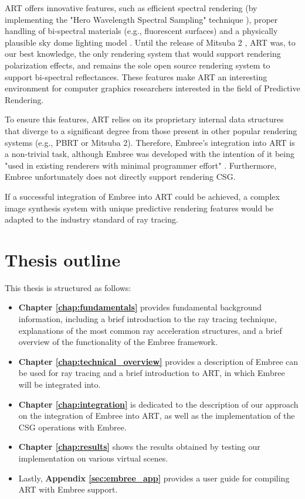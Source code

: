 ART offers innovative features, such as efficient spectral rendering (by implementing the "Hero Wavelength Spectral Sampling" technique \cite{wilkie2014hero}), proper handling of bi-spectral materials (e.g., fluorescent surfaces) \cite{mojzik2018handling} and a physically plausible sky dome lighting model \cite{wilkie2013predicting}. Until the release of Mitsuba 2 \cite{nimier2019mitsuba}, ART was, to our best knowledge, the only rendering system that would support rendering polarization effects, and remains the sole open source rendering system to support bi-spectral reflectances. These features make ART an interesting environment for computer graphics researchers interested in the field of Predictive Rendering.

To ensure this features, ART relies on its proprietary internal data structures that diverge to a significant degree from those present in other popular rendering systems (e.g., PBRT \cite{pharr2016physically} or Mitsuba 2). Therefore, Embree's integration into ART is a non-trivial task, although Embree was developed with the intention of it being "used in existing renderers with minimal programmer effort" \cite[1]{wald2014embree}. Furthermore, Embree unfortunately does not directly support rendering CSG.

If a successful integration of Embree into ART could be achieved, a complex image synthesis system with unique predictive rendering features would be adapted to the industry standard of ray tracing. 

\section*{Thesis outline}

This thesis is structured as follows:

\begin{itemize}
	\setlength\itemsep{0.05em}
	
	\item \textbf{Chapter \ref{chap:fundamentals}} provides fundamental background information, including a brief introduction to the ray tracing technique, explanations of the most common ray acceleration structures, and a brief overview of the functionality of the Embree framework.
	
	\item \textbf{Chapter \ref{chap:technical_overview}} provides a description of Embree can be used for ray tracing and a brief introduction to ART, in which Embree will be integrated into.
	
	\item \textbf{Chapter \ref{chap:integration}} is dedicated to the description of our approach on the integration of Embree into ART, as well as the implementation of the CSG operations with Embree.
	
	\item \textbf{Chapter \ref{chap:results}} shows the results obtained by testing our implementation on various virtual scenes.
	
	\item Lastly, \textbf{Appendix \ref{sec:embree_app}} provides a user guide for compiling ART with Embree support.
	
\end{itemize}
